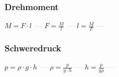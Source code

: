 \subsubsection{Drehmoment} 
\begin{minipage}{0.45\textwidth} 
\end{minipage} 
\begin{minipage}{0.45\textwidth} 
 
\end{minipage} 
$ M = F\cdot l $ \textcolor{lightgray}{\textbf{---}} 
$ F = \frac{M}{l} $ \textcolor{lightgray}{\textbf{---}} 
$ l = \frac{M}{F} $ \textcolor{lightgray}{\textbf{---}} 

\subsubsection{Schweredruck} 
\begin{minipage}{0.45\textwidth} 
\end{minipage} 
\begin{minipage}{0.45\textwidth} 
 
\end{minipage} 
$ p =  \rho \cdot g\cdot h $ \textcolor{lightgray}{\textbf{---}} 
$ \rho  = \frac{p}{g\cdot h} $ \textcolor{lightgray}{\textbf{---}} 
$ h = \frac{p}{g \rho } $ \textcolor{lightgray}{\textbf{---}} 

